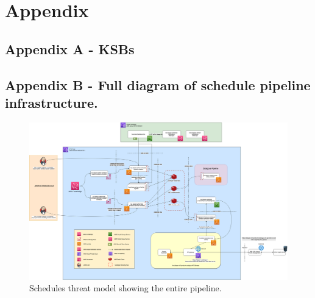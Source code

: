 
\section{Appendix}
  \subsection{Appendix A - KSBs}
  
  
  
  
  
  

  
  
  

  
  
  
  
  
  
  
  
  
  
  

  
  
  
  
  

  

\begin{landscape}
  \subsection{Appendix B - Full diagram of schedule pipeline infrastructure.}
    \begin{figure}[H]
      \centering
      \includegraphics[width=18cm]{assets/schedulesThreatModel.drawio.png}
      \caption{Schedules threat model showing the entire pipeline.}
    \end{figure}  
\end{landscape}
